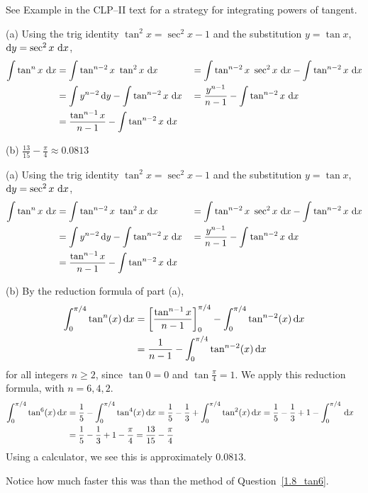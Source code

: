 \begin{hint}
See Example  in the
CLP--II text for a strategy for integrating powers of tangent.
\end{hint}

\begin{answer} (a) Using the trig identity $\tan^2x=\sec^2 x-1$ and the substitution
$y=\tan x$, $\mathrm{d}y=\sec^2 x\  \mathrm{d}x$,
\begin{alignat*}{3}
\int\tan^nx\ \mathrm{d}x
&=\int\tan^{n-2}x\ \tan^2x\ \mathrm{d}x
&&=\int\tan^{n-2}x\ \sec^2x\ \mathrm{d}x-\int\tan^{n-2}x\ \mathrm{d}x\\
&=\int y^{n-2}\,\mathrm{d}y-\int\tan^{n-2}x\ \mathrm{d}x
&&=\frac{y^{n-1}}{n-1}-\int\tan^{n-2}x\ \mathrm{d}x\\
&=\frac{\tan^{n-1}x}{n-1} -\int\tan^{n-2}x\ \mathrm{d}x
\end{alignat*}

 (b) $\displaystyle\frac{13}{15}-\frac{\pi}{4}\approx0.0813$
\end{answer}

\begin{solution} (a)
Using the trig identity $\tan^2x=\sec^2 x-1$ and the substitution
$y=\tan x$, $\mathrm{d}y=\sec^2 x\  \mathrm{d}x$,
\begin{alignat*}{3}
\int\tan^nx\ \mathrm{d}x
&=\int\tan^{n-2}x\ \tan^2x\ \mathrm{d}x
&&=\int\tan^{n-2}x\ \sec^2x\ \mathrm{d}x-\int\tan^{n-2}x\ \mathrm{d}x\\
&=\int y^{n-2}\,\mathrm{d}y-\int\tan^{n-2}x\ \mathrm{d}x
&&=\frac{y^{n-1}}{n-1}-\int\tan^{n-2}x\ \mathrm{d}x\\
&=\frac{\tan^{n-1}x}{n-1} -\int\tan^{n-2}x\ \mathrm{d}x
\end{alignat*}

\noindent (b)
By the reduction formula of part (a),
\begin{align*}
\int_0^{\pi/4}\tan^n(x)\,\mathrm{d}x&=
\left[\frac{\tan^{n-1}x}{n-1}\right]_{0}^{\pi/4}-\int_0^{\pi/4}\tan^{n-2}(x)\,\mathrm{d}x\\
&=\frac{1}{n-1}-\int_0^{\pi/4}\tan^{n-2}(x)\,\mathrm{d}x
\end{align*}
for all integers $n\ge 2$, since $\tan 0=0$ and $\tan\frac{\pi}{4}=1$.
We apply this reduction formula, with $n=6,4,2$.
\begin{align*}
\int_0^{\pi/4}\tan^6(x)\,\mathrm{d}x
&=\frac{1}{5}-\int_0^{\pi/4}\tan^4(x)\,\mathrm{d}x
=\frac{1}{5}-\frac{1}{3}+\int_0^{\pi/4}\tan^2(x)\,\mathrm{d}x
=\frac{1}{5}-\frac{1}{3}+1-\int_0^{\pi/4}\,\mathrm{d}x\cr
&=\frac{1}{5}-\frac{1}{3}+1-\frac{\pi}{4}
=\frac{13}{15}-\frac{\pi}{4}
\end{align*}
Using a calculator, we see this is approximately $0.0813$.

Notice how much faster this was than the method of Question~\ref{1.8_tan6}.
\end{solution}

